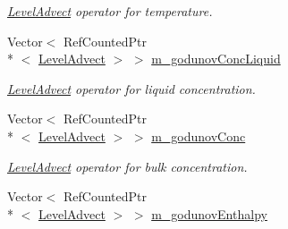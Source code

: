 \begin{DoxyCompactItemize}
\begin{DoxyCompactList}\small\item\em \hyperlink{class_level_advect}{Level\-Advect} operator for temperature. \end{DoxyCompactList}\item 
\hypertarget{classamr_mushy_layer_aba9987a4f0476ddf3667ad93ee15381f}{Vector$<$ Ref\-Counted\-Ptr\\*
$<$ \hyperlink{class_level_advect}{Level\-Advect} $>$ $>$ \hyperlink{classamr_mushy_layer_aba9987a4f0476ddf3667ad93ee15381f}{m\-\_\-godunov\-Conc\-Liquid}}\label{classamr_mushy_layer_aba9987a4f0476ddf3667ad93ee15381f}

\begin{DoxyCompactList}\small\item\em \hyperlink{class_level_advect}{Level\-Advect} operator for liquid concentration. \end{DoxyCompactList}\item 
\hypertarget{classamr_mushy_layer_a38ab0e7bd321b69e31cc92ab2d691b73}{Vector$<$ Ref\-Counted\-Ptr\\*
$<$ \hyperlink{class_level_advect}{Level\-Advect} $>$ $>$ \hyperlink{classamr_mushy_layer_a38ab0e7bd321b69e31cc92ab2d691b73}{m\-\_\-godunov\-Conc}}\label{classamr_mushy_layer_a38ab0e7bd321b69e31cc92ab2d691b73}

\begin{DoxyCompactList}\small\item\em \hyperlink{class_level_advect}{Level\-Advect} operator for bulk concentration. \end{DoxyCompactList}\item 
\hypertarget{classamr_mushy_layer_a4d5020eb95fb17dfb501f8352eb27c7b}{Vector$<$ Ref\-Counted\-Ptr\\*
$<$ \hyperlink{class_level_advect}{Level\-Advect} $>$ $>$ \hyperlink{classamr_mushy_layer_a4d5020eb95fb17dfb501f8352eb27c7b}{m\-\_\-godunov\-Enthalpy}}\label{classamr_mushy_layer_a4d5020eb95fb17dfb501f8352eb27c7b}


\end{DoxyCompactItemize}
